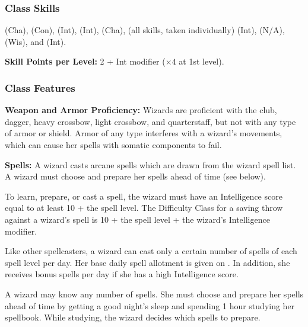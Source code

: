 \subsubsection{Class Skills}
 (Cha),  (Con),  (Int),  (Int),  (Cha),  (all skills, taken individually) (Int),  (N/A),  (Wis), and  (Int).

\textbf{Skill Points per Level:} 2 + Int modifier ($\times4$ at 1st level).

\subsubsection{Class Features}
\textbf{Weapon and Armor Proficiency:} Wizards are proficient with the club, dagger, heavy crossbow, light crossbow, and quarterstaff, but not with any type of armor or shield. Armor of any type interferes with a wizard's movements, which can cause her spells with somatic components to fail.

\textbf{Spells:} A wizard casts arcane spells which are drawn from the wizard spell list. A wizard must choose and prepare her spells ahead of time (see below).

To learn, prepare, or cast a spell, the wizard must have an Intelligence score equal to at least 10 + the spell level. The Difficulty Class for a saving throw against a wizard's spell is 10 + the spell level + the wizard's Intelligence modifier.

Like other spellcasters, a wizard can cast only a certain number of spells of each spell level per day. Her base daily spell allotment is given on . In addition, she receives bonus spells per day if she has a high Intelligence score.

A wizard may know any number of spells. She must choose and prepare her spells ahead of time by getting a good night's sleep and spending 1 hour studying her spellbook. While studying, the wizard decides which spells to prepare.

